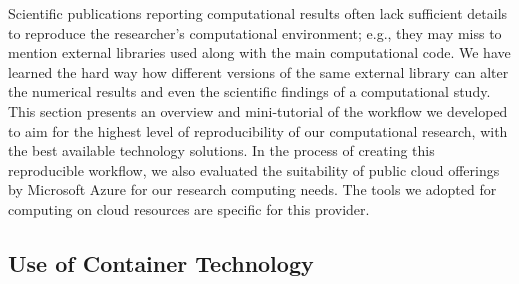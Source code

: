 \documentclass[10pt,journal,compsoc]{IEEEtran}
\begin{document}
Scientific publications reporting computational results often lack sufficient details to reproduce the researcher's computational environment; e.g., they may miss to mention external libraries used along with the main computational code.
We have learned the hard way how different versions of the same external library can alter the numerical results and even the scientific findings of a computational study\cite{mesnard_barba_2017}.
This section presents an overview and mini-tutorial of the workflow we developed to aim for the highest level of reproducibility of our computational research, with the best available technology solutions. 
In the process of creating this reproducible workflow, we also evaluated the suitability of public cloud offerings by Microsoft Azure for our research computing needs. 
The tools we adopted for computing on cloud resources are specific for this provider. 

\subsection{Use of Container Technology}
\end{document}
